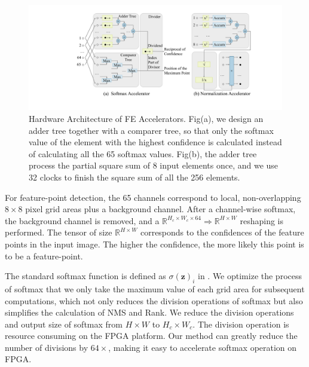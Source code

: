 \begin{figure}[t]
    \centering  
    \includegraphics[width=0.99\linewidth]{fig/FEaccelerator.pdf}
    \vspace{-7mm}
    \caption{Hardware Architecture of FE Accelerators. Fig(a), we design an adder tree together with a comparer tree, so that only the softmax value of the element with the highest confidence is calculated instead of calculating all the 65 softmax values. Fig(b), the adder tree process the partial square sum of 8 input elements once, and we use 32 clocks to finish the square sum of all the 256 elements.}
    \label{fig:FEaccelerator}
\end{figure}

For feature-point detection, the 65 channels correspond to local, non-overlapping $8 \times 8$ pixel grid areas plus a background channel. 
After a channel-wise softmax, the background channel is removed, and a $\mathbb{R}^{H_c\times W_c\times64}\Rightarrow \mathbb{R}^{H\times W}$ reshaping is performed. 
The tensor of size $\mathbb{R}^{H\times W}$ corresponds to the confidences of the feature points in the input image. The higher the confidence, the more likely this point is to be a feature-point.

The standard softmax function is defined as $\sigma (\mathbf {z} )_{i}$ in .
We optimize the process of softmax that we only take the maximum value of each grid area for subsequent computations, which not only reduces the division operations of softmax but also simplifies the calculation of NMS and Rank.
We reduce the division operations and output size of softmax from $H \times W$ to $H_c \times W_c$.
The division operation is resource consuming on the FPGA platform. 
Our method can greatly reduce the number of divisions by $64 \times$, making it easy to accelerate softmax operation on FPGA.

